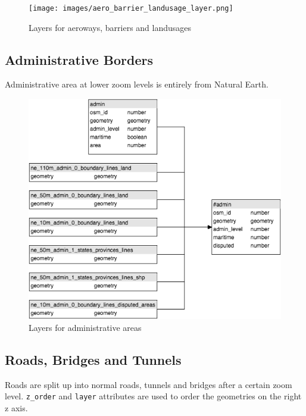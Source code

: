 \begin{figure}[h]
  \centering
  \texttt{[image: images/aero\_barrier\_landusage\_layer.png]}
  \caption{Layers for aeroways, barriers and landusages}
\end{figure}

\newpage
\subsection{Administrative Borders}
Administrative area at lower zoom levels is entirely from Natural Earth.

\begin{figure}[h]
  \centering
  \includegraphics[scale=0.6]{images/admin_layer.png}
  \caption{Layers for administrative areas}
\end{figure}

\newpage
\subsection{Roads, Bridges and Tunnels}
Roads are split up into normal roads, tunnels and bridges after a certain zoom level. \texttt{z\_order} and \texttt{layer} attributes are used to order the geometries on the right z axis.

